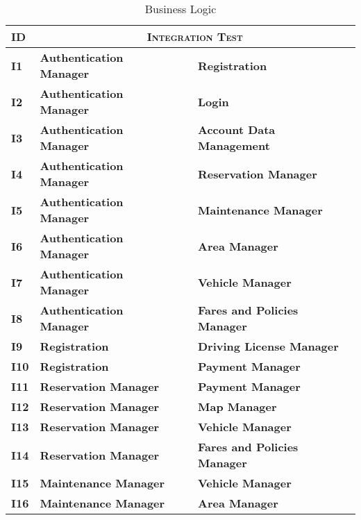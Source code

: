 \begin{longtable}{ |l|lcl| }
  \caption{Business Logic} \\
	\hline
	\textbf{ID} & \multicolumn{3}{c|}{\textbf{\textsc{Integration Test}}} \\
  \hline
  \textbf{I1} & \textbf{Authentication Manager} & \textbf{\textrightarrow{}} & \textbf{Registration} \\
  \hline
  \textbf{I2} & \textbf{Authentication Manager} & \textbf{\textrightarrow{}} & \textbf{Login} \\
  \hline
  \textbf{I3} & \textbf{Authentication Manager} & \textbf{\textrightarrow{}} & \textbf{Account Data Management} \\
  \hline
  \textbf{I4} & \textbf{Authentication Manager} & \textbf{\textrightarrow{}} & \textbf{Reservation Manager} \\
  \hline
  \textbf{I5} & \textbf{Authentication Manager} & \textbf{\textrightarrow{}} & \textbf{Maintenance Manager} \\
  \hline
  \textbf{I6} & \textbf{Authentication Manager} & \textbf{\textrightarrow{}} & \textbf{Area Manager} \\
  \hline
  \textbf{I7} & \textbf{Authentication Manager} & \textbf{\textrightarrow{}} & \textbf{Vehicle Manager} \\
  \hline
  \textbf{I8} & \textbf{Authentication Manager} & \textbf{\textrightarrow{}} & \textbf{Fares and Policies Manager} \\
  \hline
  \textbf{I9} & \textbf{Registration} & \textbf{\textrightarrow{}} & \textbf{Driving License Manager} \\
  \hline
  \textbf{I10} & \textbf{Registration} & \textbf{\textrightarrow{}} & \textbf{Payment Manager} \\
  \hline
  \textbf{I11} & \textbf{Reservation Manager} & \textbf{\textrightarrow{}} & \textbf{Payment Manager} \\
  \hline
  \textbf{I12} & \textbf{Reservation Manager} & \textbf{\textrightarrow{}} & \textbf{Map Manager} \\
  \hline
  \textbf{I13} & \textbf{Reservation Manager} & \textbf{\textrightarrow{}} & \textbf{Vehicle Manager} \\
  \hline
  \textbf{I14} & \textbf{Reservation Manager} & \textbf{\textrightarrow{}} & \textbf{Fares and Policies Manager} \\
  \hline
  \textbf{I15} & \textbf{Maintenance Manager} & \textbf{\textrightarrow{}} & \textbf{Vehicle Manager} \\
  \hline
  \textbf{I16} & \textbf{Maintenance Manager} & \textbf{\textrightarrow{}} & \textbf{Area Manager} \\
  \hline
\end{longtable}

